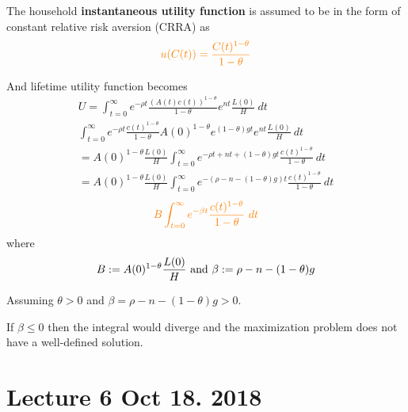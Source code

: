 \documentclass[11pt]{article}
\begin{document}
	\begin{assumption}
		The household \textbf{instantaneous utility function} is assumed to be in the form of constant relative risk aversion (CRRA) as 
		\begin{equation}
		\textcolor{orange}{
			u(C(t)) = \frac{C(t)^{1 - \theta}}{1 - \theta}
			}
		\end{equation}
	\end{assumption}
	And lifetime utility function becomes
	\begin{gather*}
		U = \int_{t=0}^\infty e^{-\rho t} \frac{(A(t)c(t))^{1-\theta}}{1-\theta} e^{nt} \frac{L(0)}{H}\ dt\\
		\int_{t=0}^\infty e^{-\rho t} \frac{c(t)^{1-\theta}}{1-\theta} A(0)^{1-\theta} e^{(1-\theta)gt} e^{nt} \frac{L(0)}{H}\ dt\\
		= A(0)^{1 - \theta} \frac{L(0)}{H} \int_{t=0}^\infty {e^{-\rho t + nt + (1-\theta)gt} \frac{c(t)^{1-\theta}}{1-\theta}\ dt} \\
		= A(0)^{1 - \theta} \frac{L(0)}{H} \int_{t=0}^\infty {e^{-(\rho - n - (1-\theta)g)t} \frac{c(t)^{1-\theta}}{1-\theta}\ dt}
	\end{gather*}
	\begin{equation}
	\textcolor{orange}{
		B \int_{t=0}^\infty e^{-\beta t}\frac{c(t)^{1-\theta}}{1- \theta}\ dt
	}
	\end{equation}
	where
	\begin{equation}
		B := A(0)^{1-\theta} \frac{L(0)}{H}\text{{ and }} \beta := \rho - n - (1-\theta)g
	\end{equation}
	\begin{assumption}
		Assuming $\theta > 0$ and $\beta = \rho - n - (1-\theta)g > 0$.
	\end{assumption}
	
	\begin{remark}
		If $\beta \leq 0$ then the integral would diverge and the maximization problem does not have a well-defined solution.
	\end{remark}
	
	\section{Lecture 6 Oct 18. 2018}
\end{document}
